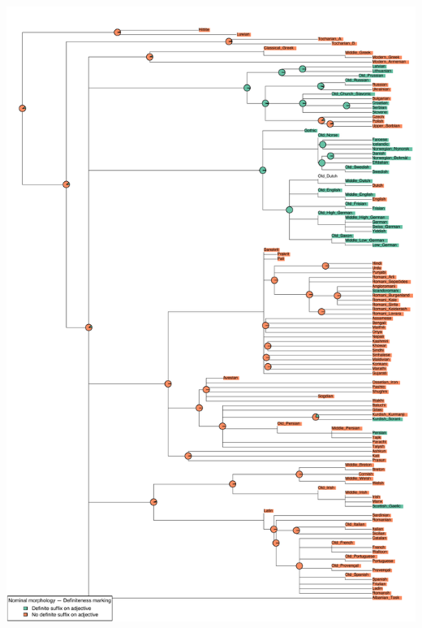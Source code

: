\includegraphics[width=.9\linewidth]{supp-graphics/NominalmorphologyDefinitenessmarkingADJDEF.pdf}

